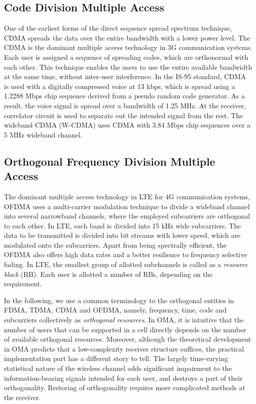 \begin{multicols}{2}
\subsection{Code Division Multiple Access}
One of the earliest forms of the direct sequence spread spectrum technique, CDMA spreads the data over the entire bandwidth with a lower power level. The CDMA is the dominant multiple access technology in 3G communication systems. Each user is assigned a sequence of spreading codes, which are orthonormal with each other. This technique enables the users to use the entire available bandwidth at the same time, without inter-user interference. In the IS-95 standard, CDMA is used with a digitally compressed voice at 13 kbps, which is spread using a 1.2288 Mbps chip sequence derived from a pseudo random code generator. As a result, the voice signal is spread over a bandwidth of 1.25 MHz. At the receiver, correlator circuit is used to separate out the intended signal from the rest. The wideband CDMA (W-CDMA) uses CDMA with 3.84 Mbps chip sequences over a 5 MHz wideband channel.

\subsection{Orthogonal Frequency Division Multiple Access}
The dominant multiple access technology in LTE for 4G communication systems, OFDMA uses a multi-carrier modulation technique to divide a wideband channel into several narrowband channels, where the employed subcarriers are orthogonal to each other. In LTE, each band is divided into 15 kHz wide subcarriers. The data to be transmitted is divided into bit streams with lower speed, which are modulated onto the subcarriers. Apart from being spectrally efficient, the OFDMA also offers high data rates and a better resilience to frequency selective fading. In LTE, the smallest group of allotted subchannels is called as a \emph{resource block} (RB). Each user is allotted a number of RBs, depending on the requirement.

In the following, we use a common terminology to the orthogonal entities in FDMA, TDMA, CDMA and OFDMA, namely, frequency, time, code and subcarriers collectively as \emph{orthogonal resources}. In OMA, it is intuitive that the number of users that can be supported in a cell directly depends on the number of available orthogonal resources. Moreover, although the theoretical development in OMA predicts that a low-complexity receiver structure suffices, the practical implementation part has a different story to tell. The largely time-varying statistical nature of the wireless channel adds significant impairment to the information-bearing signals intended for each user, and destroys a part of their orthogonality. Restoring of orthogonality requires more complicated methods at the receiver.


\end{multicols}
